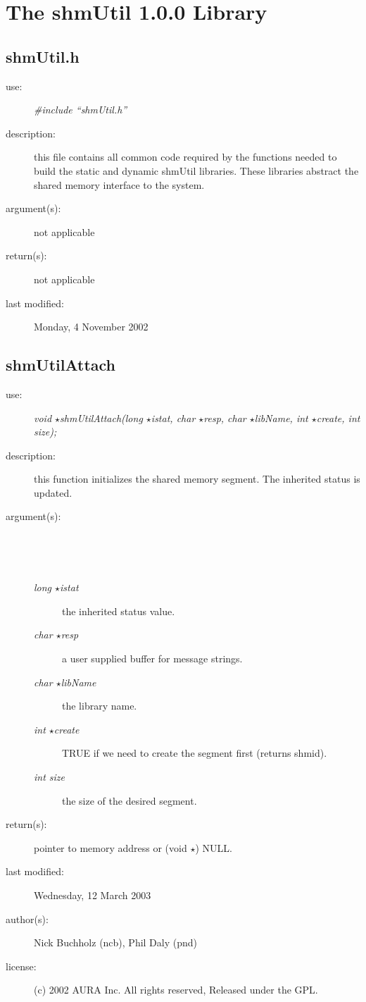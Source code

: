 \section {The shmUtil 1.0.0 Library} \subsection {shmUtil.h} \begin{description} \item[\sc use:] \emph{\#include ``shmUtil.h''} \item[\sc description:] this file contains all common code required by the functions needed to build the static and dynamic shmUtil libraries. These libraries abstract the shared memory interface to the system. \item[\sc argument(s):] not applicable \item[\sc return(s):] not applicable \item[\sc last modified:] Monday, 4 November 2002 \end{description}
\subsection {shmUtilAttach} \begin{description} \item[\sc use:] \emph{void $\star$shmUtilAttach(long $\star$istat, char $\star$resp, char $\star$libName, int $\star$create, int size);} \item[\sc description:] this function initializes the shared memory segment. The inherited status is updated. \item[\sc argument(s):] \begin{description} \item[\ ] \ \item[\emph{long $\star$istat}] the inherited status value. \item[\emph{char $\star$resp}] a user supplied buffer for message strings. \item[\emph{char $\star$libName}] the library name. \item[\emph{int $\star$create}] TRUE if we need to create the segment first (returns shmid). \item[\emph{int size}] the size of the desired segment. \end{description} \item[\sc return(s):] pointer to memory address or (void $\star$) NULL. \item[\sc last modified:] Wednesday, 12 March 2003 \item[\sc author(s):] Nick Buchholz (ncb), Phil Daly (pnd) \item[\sc license:] (c) 2002 AURA Inc. All rights reserved, Released under the GPL. \end{description}
